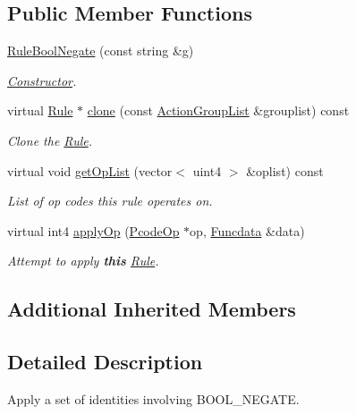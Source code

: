 \subsection*{Public Member Functions}
\begin{DoxyCompactItemize}
\item 
\mbox{\hyperlink{class_rule_bool_negate_a4746885371315943fe28ddf66a5794fc}{Rule\+Bool\+Negate}} (const string \&g)
\begin{DoxyCompactList}\small\item\em \mbox{\hyperlink{class_constructor}{Constructor}}. \end{DoxyCompactList}\item 
virtual \mbox{\hyperlink{class_rule}{Rule}} $\ast$ \mbox{\hyperlink{class_rule_bool_negate_a4e69c7e3e7588953be7ba4a9b987dd23}{clone}} (const \mbox{\hyperlink{class_action_group_list}{Action\+Group\+List}} \&grouplist) const
\begin{DoxyCompactList}\small\item\em Clone the \mbox{\hyperlink{class_rule}{Rule}}. \end{DoxyCompactList}\item 
virtual void \mbox{\hyperlink{class_rule_bool_negate_ad3d2e02996b281f50f45f0fc830f7a8b}{get\+Op\+List}} (vector$<$ uint4 $>$ \&oplist) const
\begin{DoxyCompactList}\small\item\em List of op codes this rule operates on. \end{DoxyCompactList}\item 
virtual int4 \mbox{\hyperlink{class_rule_bool_negate_a0cc46713ccb8464cc054c5eef9ad5de1}{apply\+Op}} (\mbox{\hyperlink{class_pcode_op}{Pcode\+Op}} $\ast$op, \mbox{\hyperlink{class_funcdata}{Funcdata}} \&data)
\begin{DoxyCompactList}\small\item\em Attempt to apply {\bfseries{this}} \mbox{\hyperlink{class_rule}{Rule}}. \end{DoxyCompactList}\end{DoxyCompactItemize}
\subsection*{Additional Inherited Members}


\subsection{Detailed Description}
Apply a set of identities involving B\+O\+O\+L\+\_\+\+N\+E\+G\+A\+TE. 

